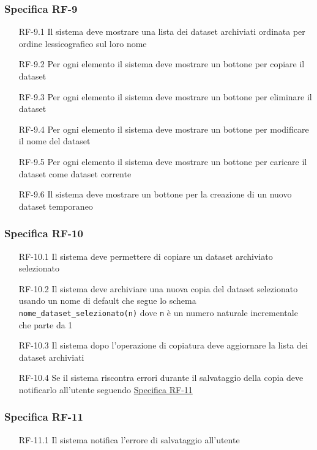 \subsubsection{Specifica RF-9}
\label{subsubsec:RF-9}
\begin{enumerate}
    \item[RF-9.1] Il sistema deve mostrare una lista dei dataset archiviati ordinata per ordine lessicografico sul loro nome
    \item[RF-9.2] Per ogni elemento il sistema deve mostrare un bottone per copiare il dataset
    \item[RF-9.3] Per ogni elemento il sistema deve mostrare un bottone per eliminare il dataset
    \item[RF-9.4] Per ogni elemento il sistema deve mostrare un bottone per modificare il nome del dataset
    \item[RF-9.5] Per ogni elemento il sistema deve mostrare un bottone per caricare il dataset come dataset corrente 
    \item[RF-9.6] Il sistema deve mostrare un bottone per la creazione di un nuovo dataset temporaneo
\end{enumerate}

\subsubsection{Specifica RF-10}
\label{subsubsec:RF-10}
\begin{enumerate}
    \item[RF-10.1] Il sistema deve permettere di copiare un dataset archiviato selezionato
    \item[RF-10.2] Il sistema deve archiviare una nuova copia del dataset selezionato usando un nome di default che segue lo schema \texttt{nome\_dataset\_selezionato(n)} dove \texttt{n} è un numero naturale incrementale che parte da 1
    \item[RF-10.3] Il sistema dopo l'operazione di copiatura deve aggiornare la lista dei dataset archiviati
    \item[RF-10.4] Se il sistema riscontra errori durante il salvataggio della copia deve notificarlo all'utente seguendo \hyperref[subsubsec:RF-11]{Specifica RF-11}
\end{enumerate}

\subsubsection{Specifica RF-11}
\label{subsubsec:RF-11}
\begin{enumerate}
    \item[RF-11.1] Il sistema notifica l'errore di salvataggio all'utente
\end{enumerate}

